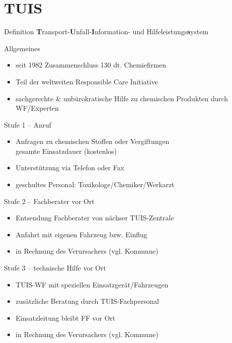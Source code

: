 \section{TUIS}
\begin{warningbox}{Definition}
    \textbf{T}ransport-\textbf{U}nfall-\textbf{I}nformation- und Hilfeleistungs\textbf{s}ystem
\end{warningbox}
\begin{sectionbox}{Allgemeines}
    \begin{itemize}
        \item seit 1982 Zusammenschluss 130 dt. Chemiefirmen
        \item Teil der weltweiten Responsible Care Initiative
        \item sachgerechte \& unbürokratische Hilfe zu chemischen Produkten durch WF/Experten
    \end{itemize}
\end{sectionbox}
\begin{sectionbox}{Stufe 1 -- Anruf}
    \begin{itemize}
        \item Anfragen zu chemischen Stoffen oder Vergiftungen\\
        \ra gesamte Einsatzdauer (kostenlos)
        \item Unterstützung via Telefon oder Fax
        \item geschultes Personal: Toxikologe/Chemiker/Werkarzt
    \end{itemize}
\end{sectionbox}
\begin{sectionbox}{Stufe 2 -- Fachberater vor Ort}
    \begin{itemize}
        \item Entsendung Fachberater von nächser TUIS-Zentrale
        \item Anfahrt mit eigenen Fahrzeug bzw. Einflug
        \item in Rechnung des Verursachers (vgl. Kommune)
    \end{itemize}
\end{sectionbox}
\begin{sectionbox}{Stufe 3 -- technische Hilfe vor Ort}
    \begin{itemize}
        \item TUIS-WF mit speziellen Einsatzgerät/Fahrzeugen
        \item zusätzliche Beratung durch TUIS-Fachpersonal
        \item Einsatzleitung bleibt FF vor Ort
        \item in Rechnung des Verursachers (vgl. Kommune)
    \end{itemize}
\end{sectionbox}
